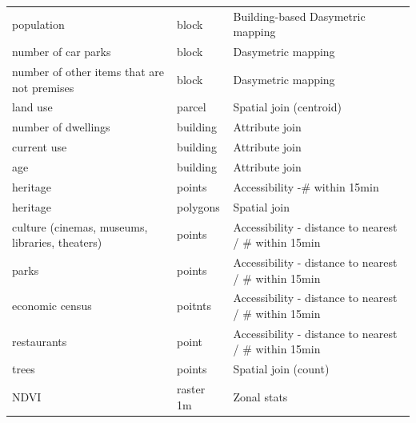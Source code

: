 \begin{longtable}{p{5cm}p{3cm}p{5cm}}
\bottomrule
\endlastfoot
                                        population &              block &                  Building-based Dasymetric mapping \\
                               number of car parks &              block &                                 Dasymetric mapping \\
       number of other items that are not premises &              block &                                 Dasymetric mapping \\
                                          land use &             parcel &                            Spatial join (centroid) \\
                               number of dwellings &           building &                                     Attribute join \\
                                       current use &           building &                                     Attribute join \\
                                               age &           building &                                     Attribute join \\
                                          heritage &             points &                     Accessibility  -\# within 15min \\
                                          heritage &           polygons &                                       Spatial join \\
   culture (cinemas, museums, libraries, theaters) &             points & Accessibility  - distance to nearest / \# within 15min \\
                                             parks &             points & Accessibility  - distance to nearest / \# within 15min \\
                                   economic census &            poitnts & Accessibility  - distance to nearest / \# within 15min \\
                                       restaurants &              point & Accessibility  - distance to nearest / \# within 15min \\
                                             trees &             points &                               Spatial join (count) \\
                                              NDVI &          raster 1m &                                        Zonal stats \\
\end{longtable}

